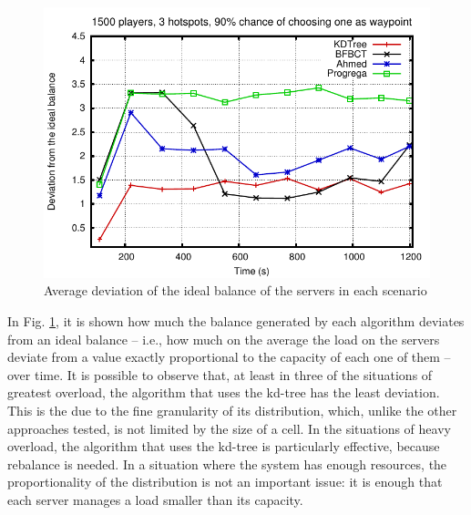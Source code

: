 \documentclass[acmjacm]{acmtrans2m}
\newcommand{\figurecaption}{Fig.}
\begin{document}
\begin{figure}[!t]
	\includegraphics[width=0.49\linewidth]{data/1500players_prob90/usagedeviation}

	\caption{Average deviation of the ideal balance of the servers in each scenario}
	\label{fig:usagedeviation}
\end{figure}

In \figurecaption{} \ref{fig:usagedeviation}, it is shown how much the balance generated by each algorithm deviates from an ideal balance -- i.e., how much on the average the load on the servers deviate from a value exactly proportional to the capacity of each one of them -- over time. It is possible to observe that, at least in three of the situations of greatest overload, the algorithm that uses the kd-tree has the least deviation. This is the due to the fine granularity of its distribution, which, unlike the other approaches tested, is not limited by the size of a cell. In the situations of heavy overload, the algorithm that uses the kd-tree is particularly effective, because rebalance is needed. In a situation where the system has enough resources, the proportionality of the distribution is not an important issue: it is enough that each server manages a load smaller than its capacity.
\end{document}
